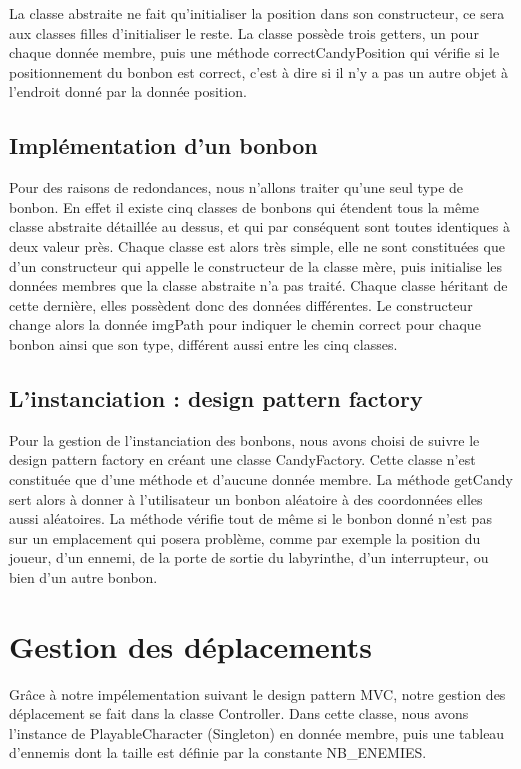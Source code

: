 \documentclass [10pt, a4paper]{article}
\begin{document}
La classe abstraite ne fait qu'initialiser la position dans son constructeur, ce sera aux classes filles d'initialiser le reste. La classe possède trois getters, un pour chaque donnée membre, puis une méthode correctCandyPosition qui vérifie si le positionnement du bonbon est correct, c'est à dire si il n'y a pas un autre objet à l'endroit donné par la donnée position.

\subsection {Implémentation d'un bonbon}
Pour des raisons de redondances, nous n'allons traiter qu'une seul type de bonbon. En effet il existe cinq classes de bonbons qui étendent tous la même classe abstraite détaillée au dessus, et qui par conséquent sont toutes identiques à deux valeur près. Chaque classe est alors très simple, elle ne sont constituées que d'un constructeur qui appelle le constructeur de la classe mère, puis initialise les données membres que la classe abstraite n'a pas traité. Chaque classe héritant de cette dernière, elles possèdent donc des données différentes. Le constructeur change alors la donnée imgPath pour indiquer le chemin correct pour chaque bonbon ainsi que son type, différent aussi entre les cinq classes.

\subsection {L'instanciation : design pattern factory}
Pour la gestion de l'instanciation des bonbons, nous avons choisi de suivre le design pattern factory en créant une classe CandyFactory. Cette classe n'est constituée que d'une méthode et d'aucune donnée membre. La méthode getCandy sert alors à donner à l'utilisateur un bonbon aléatoire à des coordonnées elles aussi aléatoires. La méthode vérifie tout de même si le bonbon donné n'est pas sur un emplacement qui posera problème, comme par exemple la position du joueur, d'un ennemi, de la porte de sortie du labyrinthe, d'un interrupteur, ou bien d'un autre bonbon.



\section {Gestion des déplacements}
Grâce à notre impélementation suivant le design pattern MVC, notre gestion des déplacement se fait dans la classe Controller. Dans cette classe, nous avons l'instance de PlayableCharacter (Singleton) en donnée membre, puis une tableau d'ennemis dont la taille est définie par la constante NB\_ENEMIES.
\end{document}
